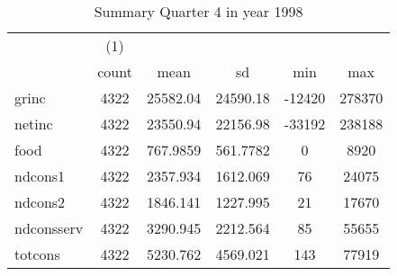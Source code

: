 \begin{table}[htbp]\centering
\def\sym#1{\ifmmode^{#1}\else\(^{#1}\)\fi}
\caption{Summary Quarter 4 in year 1998 \label{sum\_Q4\_y1998}}
\begin{tabular}{l*{1}{ccccc}}
\hline\hline
            &\multicolumn{1}{c}{(1)}&            &            &            &            \\
            &       count&        mean&          sd&         min&         max\\
\hline
grinc       &        4322&    25582.04&    24590.18&      -12420&      278370\\
netinc      &        4322&    23550.94&    22156.98&      -33192&      238188\\
food        &        4322&    767.9859&    561.7782&           0&        8920\\
ndcons1     &        4322&    2357.934&    1612.069&          76&       24075\\
ndcons2     &        4322&    1846.141&    1227.995&          21&       17670\\
ndconsserv  &        4322&    3290.945&    2212.564&          85&       55655\\
totcons     &        4322&    5230.762&    4569.021&         143&       77919\\
\hline\hline
\end{tabular}
\end{table}
